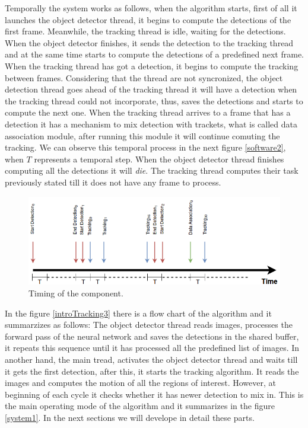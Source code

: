 Temporally the system works as follows, when the algorithm starts, first of all it launches the object detector thread, it begins to compute the detections of the first frame. Meanwhile, the tracking thread is idle, waiting for the detections. When the object detector finishes, it sends the detection to the tracking thread and at the same time starts to compute the detections of a predefined next frame. When the tracking thread has got a detection, it begins to compute the tracking between frames. Considering that the thread are not syncronized, the object detection thread goes ahead of the tracking thread it will have a detection when the tracking thread could not incorporate, thus, saves the detections and starts to compute the next one. When the tracking thread arrives to a frame that has a detection it has a mechanism to mix detection with trackets, what is called data association module, after running this module it will continue comuting the tracking. We can observe this temporal process in the next figure \ref{software2}, when $T$ represents a temporal step. When the object detector thread finishes computing all the detections it will \textit{die}. The tracking thread computes their task previously stated till it does not have any frame to process.


\begin{figure}[H]
\centering         
\includegraphics[width=14cm]{timesDiagram/timing.png}
\caption{Timing of the component.} \label{intro1}
\end{figure}


In the figure \ref{introTracking3} there is a flow chart of the algorithm and it summarzizes as follows: The object detector thread reads images, processes the forward pass of the neural network and saves the detections in the shared buffer, it repeats this sequence until it has processed all the predefined list of images. In another hand, the main tread, activates the object detector thread and waits till it gets the first detection, after this, it starts the tracking algorithm. It reads the images and computes the motion of all the regions of interest. However, at beginning of each cycle it checks whether it has newer detection to mix in. This is the main operating mode of the algorithm and it summarizes in the figure \ref{system1}. In the next sections we will develope in detail these parts. 

